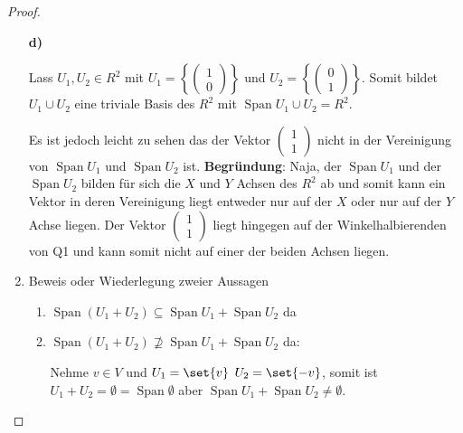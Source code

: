 \documentclass{../problemset}
\begin{document}
\begin{problem}
\begin{proof}
\begin{enumerate}
		      \textbf{d)}

		      Lass \(U_1, U_2 \in R^2\) mit \(U_1 = \left\{\begin{pmatrix}
			      1 \\0
		      \end{pmatrix}\right\}\) und \(U_2 = \left\{\begin{pmatrix}
			      0 \\1
		      \end{pmatrix}\right\}\).
		      Somit bildet \(U_1 \cup U_2\) eine triviale Basis des \(R^2\) mit \(\operatorname{Span} U_1 \cup U_2 = R^2\).

		      Es ist jedoch leicht zu sehen das der Vektor \(\begin{pmatrix}
			      1 \\ 1
		      \end{pmatrix}\) nicht in der Vereinigung von \(\operatorname{Span} U_1\) und \(\operatorname{Span} U_2\) ist.
		      \textbf{Begründung}: Naja, der \(\operatorname{Span} U_1\) und der \(\operatorname{Span} U_2\) bilden für sich die \(X\) und \(Y\)
		      Achsen des \(R^2\) ab und somit kann ein Vektor in deren Vereinigung liegt entweder nur auf der \(X\) oder nur auf der \(Y\) Achse liegen.
		      Der Vektor \(\begin{pmatrix}
			      1 \\ 1
		      \end{pmatrix}\) liegt hingegen auf der Winkelhalbierenden von Q1 und kann somit nicht auf einer der beiden Achsen liegen. \checkmark
		\item Beweis oder Wiederlegung zweier Aussagen
		      \begin{enumerate}[label=\alph*)]
			      \item $\operatorname{Span}(U_1 + U_2) \subseteq \operatorname{Span} U_1 + \operatorname{Span} U_2$ da


			      \item $\operatorname{Span}(U_1 + U_2) \not\supseteq \operatorname{Span} U_1 + \operatorname{Span} U_2$ da:

			            Nehme $v \in V$ und $U_1 = \set{v}$ $U_2 = \set {-v}$, somit ist $U_1 + U_2 = \emptyset = \operatorname{Span} \emptyset$
			            aber $\operatorname{Span} U_1 + \operatorname{Span} U_2 \neq \emptyset$. \checkmark
		      \end{enumerate}
	\end{enumerate}
\end{proof}
\end{problem}
\end{document}
